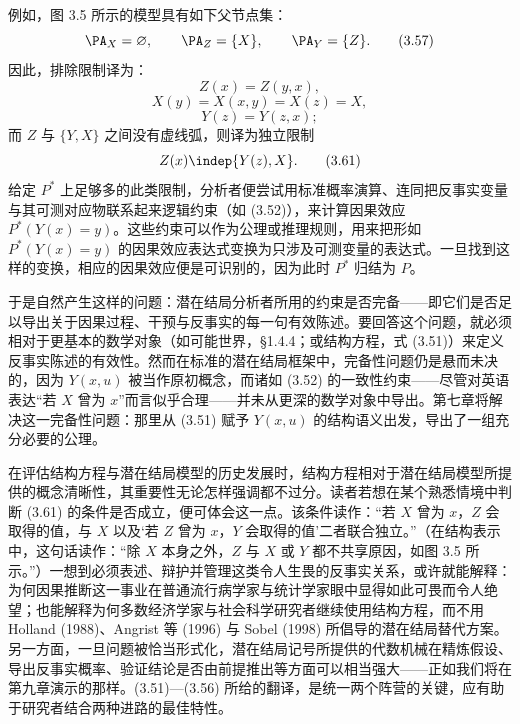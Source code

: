 例如，图 3.5 所示的模型具有如下父节点集：
\begin{equation}
\PA_X=\varnothing,\qquad \PA_Z=\{X\},\qquad \PA_Y=\{Z\}. \tag{3.57}
\end{equation}
因此，排除限制译为：
\begin{equation}
Z(x)=Z(y,x), \tag{3.58}
\end{equation}
\begin{equation}
X(y)=X(x,y)=X(z)=X, \tag{3.59}
\end{equation}
\begin{equation}
Y(z)=Y(z,x); \tag{3.60}
\end{equation}
而 $Z$ 与 $\{Y,X\}$ 之间没有虚线弧，则译为独立限制
\begin{equation}
Z(x)\indep\{Y(z),X\}. \tag{3.61}
\end{equation}
给定 $P^*$ 上足够多的此类限制，分析者便尝试用标准概率演算、连同把反事实变量与其可测对应物联系起来逻辑约束（如 \textup{(3.52)}），来计算因果效应 $P^*(Y(x)=y)$。这些约束可以作为公理或推理规则，用来把形如 $P^*(Y(x)=y)$ 的因果效应表达式变换为只涉及可测变量的表达式。一旦找到这样的变换，相应的因果效应便是可识别的，因为此时 $P^*$ 归结为 $P$。

于是自然产生这样的问题：潜在结局分析者所用的约束是否完备——即它们是否足以导出关于因果过程、干预与反事实的每一句有效陈述。要回答这个问题，就必须相对于更基本的数学对象（如可能世界，\S 1.4.4；或结构方程，式 \textup{(3.51)}）来定义反事实陈述的有效性。然而在标准的潜在结局框架中，完备性问题仍是悬而未决的，因为 $Y(x,u)$ 被当作原初概念，而诸如 \textup{(3.52)} 的一致性约束——尽管对英语表达“若 $X$ 曾为 $x$”而言似乎合理——并未从更深的数学对象中导出。第七章将解决这一完备性问题：那里从 \textup{(3.51)} 赋予 $Y(x,u)$ 的结构语义出发，导出了一组充分必要的公理。

在评估结构方程与潜在结局模型的历史发展时，结构方程相对于潜在结局模型所提供的概念清晰性，其重要性无论怎样强调都不过分。读者若想在某个熟悉情境中判断 \textup{(3.61)} 的条件是否成立，便可体会这一点。该条件读作：“若 $X$ 曾为 $x$，$Z$ 会取得的值，与 $X$ 以及‘若 $Z$ 曾为 $x$，$Y$ 会取得的值’二者联合独立。”（在结构表示中，这句话读作：“除 $X$ 本身之外，$Z$ 与 $X$ 或 $Y$ 都不共享原因，如图 3.5 所示。”）一想到必须表述、辩护并管理这类令人生畏的反事实关系，或许就能解释：为何因果推断这一事业在普通流行病学家与统计学家眼中显得如此可畏而令人绝望；也能解释为何多数经济学家与社会科学研究者继续使用结构方程，而不用 Holland (1988)、Angrist 等 (1996) 与 Sobel (1998) 所倡导的潜在结局替代方案。另一方面，一旦问题被恰当形式化，潜在结局记号所提供的代数机械在精炼假设、导出反事实概率、验证结论是否由前提推出等方面可以相当强大——正如我们将在第九章演示的那样。\textup{(3.51)}—\textup{(3.56)} 所给的翻译，是统一两个阵营的关键，应有助于研究者结合两种进路的最佳特性。

